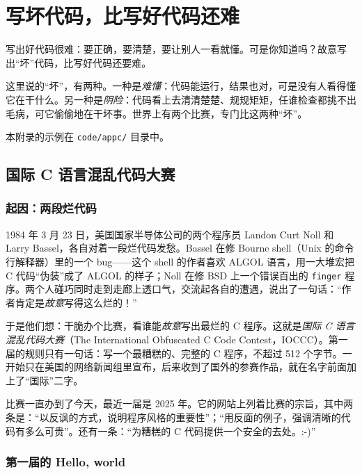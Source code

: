 \chapter{写坏代码，比写好代码还难}
\label{app:evil-code}

写出好代码很难：要正确，要清楚，要让别人一看就懂。可是你知道吗？故意写出“坏”代码，比写好代码还要难。

这里说的“坏”，有两种。一种是\emph{难懂}：代码能运行，结果也对，可是没有人看得懂它在干什么。另一种是\emph{阴险}：代码看上去清清楚楚、规规矩矩，任谁检查都挑不出毛病，可它偷偷地在干坏事。世界上有两个比赛，专门比这两种“坏”。

本附录的示例在 \texttt{code/appc/} 目录中。

\section{国际 C 语言混乱代码大赛}

\subsection{起因：两段烂代码}

1984 年 3 月 23 日，美国国家半导体公司的两个程序员 Landon Curt Noll 和 Larry Bassel，各自对着一段烂代码发愁。Bassel 在修 Bourne shell（Unix 的命令行解释器）里的一个 bug——这个 shell 的作者喜欢 ALGOL 语言，用一大堆宏把 C 代码“伪装”成了 ALGOL 的样子；Noll 在修 BSD 上一个错误百出的 \texttt{finger} 程序。两个人碰巧同时走到走廊上透口气，交流起各自的遭遇，说出了一句话：“作者肯定是\emph{故意}写得这么烂的！”

于是他们想：干脆办个比赛，看谁能\emph{故意}写出最烂的 C 程序。这就是\emph{国际 C 语言混乱代码大赛}（The International Obfuscated C Code Contest，IOCCC）。第一届的规则只有一句话：写一个最糟糕的、完整的 C 程序，不超过 512 个字节。一开始只在美国的网络新闻组里宣布，后来收到了国外的参赛作品，就在名字前面加上了“国际”二字。

比赛一直办到了今天，最近一届是 2025 年。它的网站上列着比赛的宗旨，其中两条是：“以反讽的方式，说明程序风格的重要性”；“用反面的例子，强调清晰的代码有多么可贵”。还有一条：“为糟糕的 C 代码提供一个安全的去处。:-)”

\subsection{第一届的 Hello, world}

